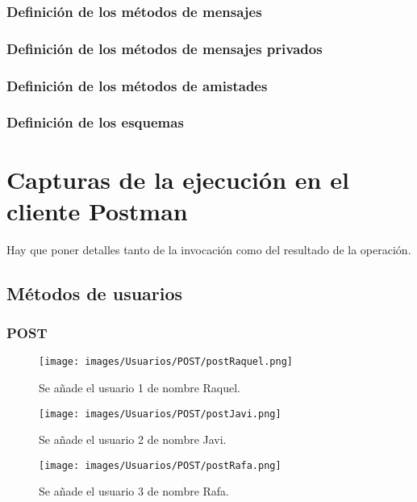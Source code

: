 \documentclass[12pt,a4paper, spanish]{article}
\begin{document}
\newpage
\subsubsection{Definición de los métodos de mensajes}


\newpage
\subsubsection{Definición de los métodos de mensajes privados}


\newpage
\subsubsection{Definición de los métodos de amistades}


\newpage
\subsubsection{Definición de los esquemas}


\newpage
\section{Capturas de la ejecución en el cliente Postman}
Hay que poner detalles tanto de la invocación como del resultado de la operación.

\subsection{Métodos de usuarios}
\subsubsection{POST}
\begin{figure}[H]
	\centering
	\texttt{[image: images/Usuarios/POST/postRaquel.png]}
	\caption{Se añade el usuario 1 de nombre Raquel.}
\end{figure}

\begin{figure}[H]
	\centering
	\texttt{[image: images/Usuarios/POST/postJavi.png]}
	\caption{Se añade el usuario 2 de nombre Javi.}
\end{figure}

\begin{figure}[H]
	\centering
	\texttt{[image: images/Usuarios/POST/postRafa.png]}
	\caption{Se añade el usuario 3 de nombre Rafa.}
\end{figure}
\end{document}
